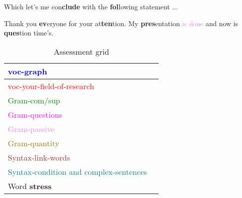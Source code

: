 Which let's me con\textbf{clude} with the \textbf{fol}lowing statement ...

Thank you \textbf{ev}eryone for your at\textbf{ten}tion. My \textbf{pres}entation \textcolor{violet}{is done} and now is \textbf{ques}tion time's.

\setlength{\arrayrulewidth}{0.5mm}
\renewcommand{\arraystretch}{3}
\begin{table}[h]
    \centering
    \caption{Assessment grid}
    \label{tab:AssessmenttGrid}
    \begin{tabular}{|l|m{10cm}|}
        \hline
        \textcolor{blue}{voc-graph} & \\
        \hline
        \textcolor{red}{voc-your-field-of-research} & \\
        \hline
        \textcolor{green}{Gram-com/sup} & \\
        \hline
        \textcolor{magenta}{Gram-questions} & \\
        \hline
        \textcolor{violet}{Gram-passive} & \\
        \hline
        \textcolor{olive}{Gram-quantity} & \\
        \hline
        \textcolor{brown}{Syntax-link-words} & \\
        \hline
        \textcolor{teal}{Syntax-condition and complex-sentences} & \\
        \hline
        Word \textbf{stress}  & \\
        \hline
    \end{tabular}
\end{table}
